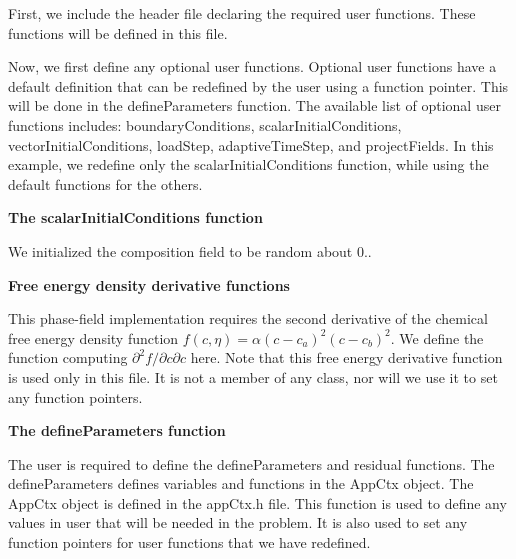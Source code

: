 First, we include the header file declaring the required user functions. These functions will be defined in this file.


\begin{DoxyCodeInclude}

\end{DoxyCodeInclude}


Now, we first define any optional user functions. Optional user functions have a default definition that can be redefined by the user using a function pointer. This will be done in the {\ttfamily define\-Parameters} function. The available list of optional user functions includes\-: {\ttfamily boundary\-Conditions}, {\ttfamily scalar\-Initial\-Conditions}, {\ttfamily vector\-Initial\-Conditions}, {\ttfamily load\-Step}, {\ttfamily adaptive\-Time\-Step}, and {\ttfamily project\-Fields}. In this example, we redefine only the {\ttfamily scalar\-Initial\-Conditions} function, while using the default functions for the others.

{\bfseries  The {\ttfamily scalar\-Initial\-Conditions} function }

We initialized the composition field to be random about 0..


\begin{DoxyCodeInclude}

\end{DoxyCodeInclude}


{\bfseries  Free energy density derivative functions }

This phase-\/field implementation requires the second derivative of the chemical free energy density function $f(c,\eta) = \alpha(c - c_a)^2(c - c_b)^2$. We define the function computing $\partial^2 f/\partial c \partial c$ here. Note that this free energy derivative function is used only in this file. It is not a member of any class, nor will we use it to set any function pointers.


\begin{DoxyCodeInclude}

\end{DoxyCodeInclude}


{\bfseries  The {\ttfamily define\-Parameters} function }

The user is required to define the {\ttfamily define\-Parameters} and {\ttfamily residual} functions. The {\ttfamily define\-Parameters} defines variables and functions in the {\ttfamily App\-Ctx} object. The {\ttfamily App\-Ctx} object is defined in the app\-Ctx.\-h file. This function is used to define any values in {\ttfamily user} that will be needed in the problem. It is also used to set any function pointers for user functions that we have redefined.

